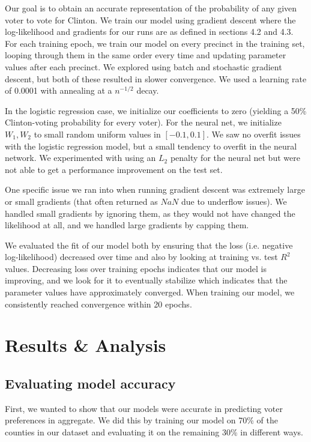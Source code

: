 \documentclass[10pt, letterpaper]{article}
\begin{document}
\begin{multicols}{2}
Our goal is to obtain an accurate representation of the probability of any given voter to vote for Clinton. We train our model using gradient descent where the log-likelihood and gradients for our runs are as defined in sections 4.2 and 4.3. For each training epoch, we train our model on every precinct in the training set, looping through them in the same order every time and updating parameter values after each precinct. We explored using batch and stochastic gradient descent, but both of these resulted in slower convergence. We used a learning rate of 0.0001 with annealing at a $n^{-1/2}$ decay. 

In the logistic regression case, we initialize our coefficients to zero (yielding a 50\% Clinton-voting probability for every voter). For the neural net, we initialize $W_1, W_2$ to small random uniform values in $[-0.1, 0.1]$. We saw no overfit issues with the logistic regression model, but a small tendency to overfit in the neural network. We experimented with using an $L_2$ penalty for the neural net but were not able to get a performance improvement on the test set. 


One specific issue we ran into when running gradient descent was extremely large or small gradients (that often returned as $NaN$ due to underflow issues). We handled small gradients by ignoring them, as they would not have changed the likelihood at all, and we handled large gradients by capping them.

We evaluated the fit of our model both by ensuring that the loss (i.e. negative log-likelihood) decreased over time and also by looking at training vs. test $R^2$ values. Decreasing loss over training epochs indicates that our model is improving, and we look for it to eventually stabilize which indicates that the parameter values have approximately converged. When training our model, we consistently reached convergence within 20 epochs.

\section{Results \& Analysis}

\subsection{Evaluating model accuracy}
First, we wanted to show that our models were accurate in predicting voter preferences in aggregate. We did this by training our model on 70\% of the counties in our dataset and evaluating it on the remaining 30\% in different ways.


\end{multicols}
\end{document}
